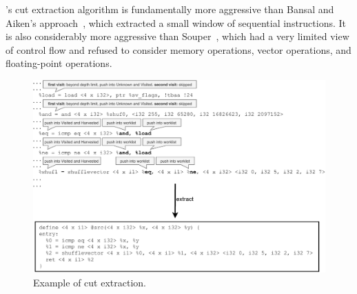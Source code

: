 \minotaur's cut extraction algorithm is fundamentally more aggressive
than Bansal and Aiken's approach~\cite{Bansal06}, which extracted a
small window of sequential instructions.
%
It is also considerably more aggressive than Souper~\cite{souper},
which had a very limited view of control flow and refused to consider
memory operations, vector operations, and floating-point operations.

\begin{figure}[tbp]
  \centering
  \includegraphics[width=0.95\linewidth]{figures/slice.pdf}
  \caption{Example of cut extraction.}
  \label{fig:cut}
\end{figure}
